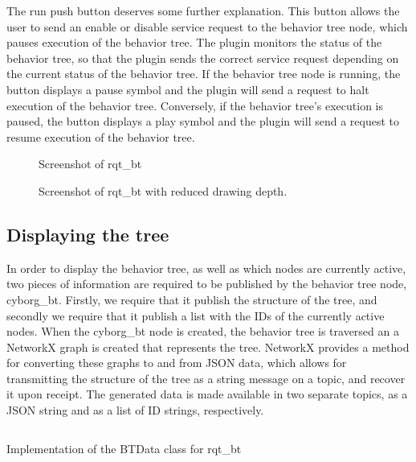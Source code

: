 \documentclass[\rootfolder/main.tex]{subfiles}
\begin{document}
The run push button deserves some further explanation.
This button allows the user to send an enable or disable service request to the behavior tree node, which pauses execution of the behavior tree.
The plugin monitors the status of the behavior tree, so that the plugin sends the correct service request depending on the current status of the behavior tree.
If the behavior tree node is running, the button displays a pause symbol and the plugin will send a request to halt execution of the behavior tree.
Conversely, if the behavior tree's execution is paused, the button displays a play symbol and the plugin will send a request to resume execution of the behavior tree.

\begin{figure}[ht]
    \caption{Screenshot of rqt\_bt}
    \label{fig:rqt-bt}
\end{figure}

\begin{figure}[ht]
    \caption{Screenshot of rqt\_bt with reduced drawing depth.}
    \label{fig:rqt-bt-depth}
\end{figure}

\subsection{Displaying the tree}

In order to display the behavior tree, as well as which nodes are currently active, two pieces of information are required to be published by the behavior tree node, cyborg\_bt.
Firstly, we require that it publish the structure of the tree, and secondly we require that it publish a list with the IDs of the currently active nodes.
When the cyborg\_bt node is created, the behavior tree is traversed an a NetworkX graph is created that represents the tree.
NetworkX provides a method for converting these graphs to and from JSON data, which allows for transmitting the structure of the tree as a string message on a topic, and recover it upon receipt.
The generated data is made available in two separate topics, as a JSON string and as a list of ID strings, respectively.

\begin{listing}
    \inputminted{Python}{\rootfolder/Chapters/Chapter4/Listings/btdata.py}
    \caption{Implementation of the BTData class for rqt\_bt}
    \label{lst:btdata}
\end{listing}
\end{document}

